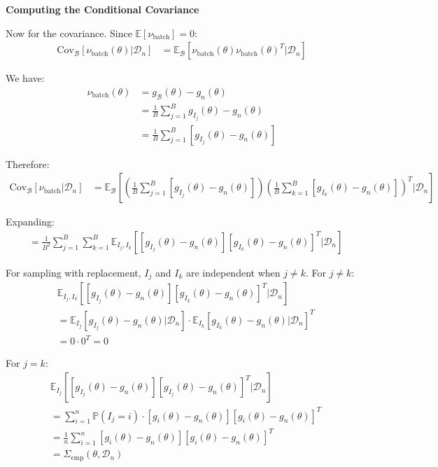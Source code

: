 \documentclass[11pt]{article}
\begin{document}
\textbf{Computing the Conditional Covariance}

Now for the covariance. Since $\mathbb{E}[\nu_{\text{batch}}] = 0$:
\begin{align}
\text{Cov}_{\mathcal{B}}[\nu_{\text{batch}}(\theta) | \mathcal{D}_n] &= \mathbb{E}_{\mathcal{B}}[\nu_{\text{batch}}(\theta) \nu_{\text{batch}}(\theta)^T | \mathcal{D}_n]
\end{align}

We have:
\begin{align}
\nu_{\text{batch}}(\theta) &= g_{\mathcal{B}}(\theta) - g_n(\theta) \\
&= \frac{1}{B} \sum_{j=1}^B g_{I_j}(\theta) - g_n(\theta) \\
&= \frac{1}{B} \sum_{j=1}^B [g_{I_j}(\theta) - g_n(\theta)]
\end{align}

Therefore:
\begin{align}
\text{Cov}_{\mathcal{B}}[\nu_{\text{batch}} | \mathcal{D}_n] &= \mathbb{E}_{\mathcal{B}}\left[\left(\frac{1}{B} \sum_{j=1}^B [g_{I_j}(\theta) - g_n(\theta)]\right)\left(\frac{1}{B} \sum_{k=1}^B [g_{I_k}(\theta) - g_n(\theta)]\right)^T \bigg| \mathcal{D}_n\right]
\end{align}

Expanding:
\begin{align}
&= \frac{1}{B^2} \sum_{j=1}^B \sum_{k=1}^B \mathbb{E}_{I_j,I_k}\left[[g_{I_j}(\theta) - g_n(\theta)][g_{I_k}(\theta) - g_n(\theta)]^T | \mathcal{D}_n\right]
\end{align}

For sampling with replacement, $I_j$ and $I_k$ are independent when $j \neq k$. For $j \neq k$:
\begin{align}
&\mathbb{E}_{I_j,I_k}[[g_{I_j}(\theta) - g_n(\theta)][g_{I_k}(\theta) - g_n(\theta)]^T | \mathcal{D}_n] \\
&= \mathbb{E}_{I_j}[g_{I_j}(\theta) - g_n(\theta) | \mathcal{D}_n] \cdot \mathbb{E}_{I_k}[g_{I_k}(\theta) - g_n(\theta) | \mathcal{D}_n]^T \\
&= 0 \cdot 0^T = 0
\end{align}

For $j = k$:
\begin{align}
&\mathbb{E}_{I_j}[[g_{I_j}(\theta) - g_n(\theta)][g_{I_j}(\theta) - g_n(\theta)]^T | \mathcal{D}_n] \\
&= \sum_{i=1}^n \mathbb{P}(I_j = i) \cdot [g_i(\theta) - g_n(\theta)][g_i(\theta) - g_n(\theta)]^T \\
&= \frac{1}{n} \sum_{i=1}^n [g_i(\theta) - g_n(\theta)][g_i(\theta) - g_n(\theta)]^T \\
&= \Sigma_{\text{emp}}(\theta, \mathcal{D}_n)
\end{align}
\end{document}
